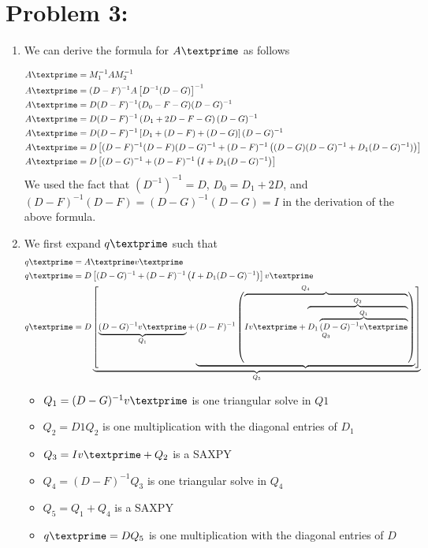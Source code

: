 \newpage
\section*{Problem 3:}
\begin{enumerate}
\item We can derive the formula for $A\textprime$ as follows

\begin{align*}
& A\textprime = M_{1}^{-1}AM_{2}^{-1} \\
& A\textprime = (D-F)^{-1}A\left[D^{-1}(D-G)\right]^{-1} \\
& A\textprime = D(D-F)^{-1}(D_{0}-F-G)(D-G)^{-1} \\
& A\textprime = D(D-F)^{-1}\left(D_{1}+2D -F-G\right)(D-G)^{-1}\\
& A\textprime = D(D-F)^{-1}\left[D_{1} + (D-F) + (D-G)\right](D-G)^{-1}\\
& A\textprime = D\left[(D-F)^{-1}(D-F)(D-G)^{-1} + (D-F)^{-1}\left( (D-G)(D-G)^{-1}+  D_{1}(D-G)^{-1})\right)\right]\\
&  A\textprime = D\left[(D-G)^{-1} + (D-F)^{-1} \left(I + D_{1}(D-G)^{-1} \right)  \right] \\
\end{align*}
We used the fact that $\left(D^{-1}\right)^{-1} = D$, $D_{0} = D_{1} + 2D$, and $(D-F)^{-1}(D-F)  = (D-G)^{-1}(D-G) =I$ in the derivation of the above formula. 

\item We first expand $q\textprime$ such that 
\begin{align*}
& q\textprime = A\textprime v\textprime \\
& q\textprime = D\left[(D-G)^{-1} + (D-F)^{-1} \left(I + D_{1}(D-G)^{-1} \right)  \right]v\textprime \\
& q\textprime = D\underbrace{\left[ \underbrace{(D-G)^{-1}v\textprime} _{Q_1}+ \underbrace{(D-F)^{-1} \left(\overbrace{Iv\textprime + \overbrace{D_{1} \overbrace{(D-G)^{-1}v\textprime}^{Q_1}}^{Q_2}}_{Q_3} \right) }^{Q_{4}} \right]}_{Q_{5}} \\
\end{align*}

\begin{itemize}
\item $Q_{1} = (D-G)^{-1}v\textprime$ is one triangular solve in $Q{1}$
\item $Q_{2} = D1Q_{2}$ is one multiplication with the diagonal entries of $D_{1}$
\item $Q_{3} = I v\textprime + Q_{2}$ is a SAXPY
\item $Q_{4} = (D-F)^{-1}Q_{3}$ is one triangular solve in $Q_{4}$
\item $Q_{5} = Q_{1} + Q_{4}$ is a SAXPY
\item $q\textprime = DQ_{5}$ is one multiplication with the diagonal entries of $D$
\end{itemize} 


\end{enumerate}
